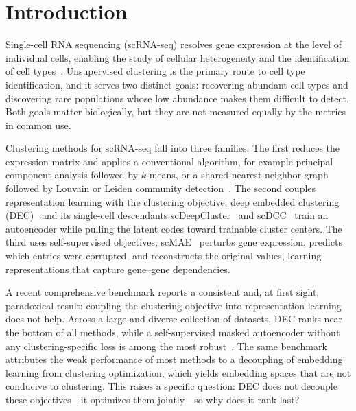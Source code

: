 \section{Introduction}

Single-cell RNA sequencing (scRNA-seq) resolves gene expression at the level of
individual cells, enabling the study of cellular heterogeneity and the identification
of cell types~\citep{kiselev2019}. Unsupervised clustering is the primary route to cell
type identification, and it serves two distinct goals: recovering abundant cell types
and discovering rare populations whose low abundance makes them difficult to detect.
Both goals matter biologically, but they are not measured equally by the metrics in
common use.

Clustering methods for scRNA-seq fall into three families. The first reduces the
expression matrix and applies a conventional algorithm, for example principal component
analysis followed by $k$-means, or a shared-nearest-neighbor graph followed by Louvain
or Leiden community detection~\citep{leiden2019}. The second couples representation
learning with the clustering objective; deep embedded clustering (DEC)~\citep{dec2016}
and its single-cell descendants scDeepCluster~\citep{scdeepcluster2019} and
scDCC~\citep{scdcc2021} train an autoencoder while pulling the latent codes toward
trainable cluster centers. The third uses self-supervised objectives; scMAE~\citep{scmae2024}
perturbs gene expression, predicts which entries were corrupted, and reconstructs the
original values, learning representations that capture gene--gene dependencies.

A recent comprehensive benchmark reports a consistent and, at first sight, paradoxical
result: coupling the clustering objective into representation learning does not help.
Across a large and diverse collection of datasets, DEC ranks near the bottom of all
methods, while a self-supervised masked autoencoder without any clustering-specific loss
is among the most robust~\citep{scclubench2025}. The same benchmark attributes the weak
performance of most methods to a decoupling of embedding learning from clustering
optimization, which yields embedding spaces that are not conducive to clustering. This
raises a specific question: DEC does not decouple these objectives---it optimizes them
jointly---so why does it rank last?


